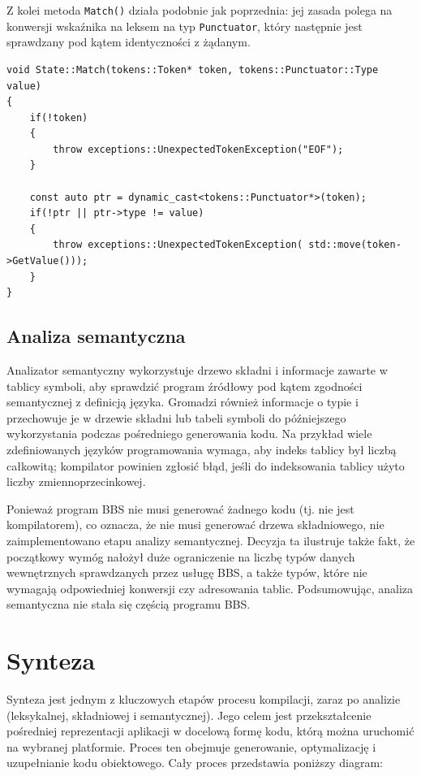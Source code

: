 Z kolei metoda \texttt{Match()} działa podobnie jak poprzednia: jej zasada polega na konwersji wskaźnika na leksem na typ \texttt{Punctuator}, który następnie jest sprawdzany pod kątem identyczności z żądanym.

\begin{lstlisting}[label=list:match,caption=Metoda State::Match(),basicstyle=\footnotesize\ttfamily]
void State::Match(tokens::Token* token, tokens::Punctuator::Type value)
{
    if(!token)
    {
        throw exceptions::UnexpectedTokenException("EOF");
    }
    
    const auto ptr = dynamic_cast<tokens::Punctuator*>(token);
    if(!ptr || ptr->type != value)
    {
        throw exceptions::UnexpectedTokenException( std::move(token->GetValue()));
    }
}
\end{lstlisting}

\subsection{Analiza semantyczna}

Analizator semantyczny wykorzystuje drzewo składni i informacje zawarte w tablicy symboli, aby sprawdzić program źródłowy pod kątem zgodności semantycznej z definicją języka. Gromadzi również informacje o typie i przechowuje je w drzewie składni lub tabeli symboli do późniejszego wykorzystania podczas pośredniego generowania kodu.
Na przykład wiele zdefiniowanych języków programowania wymaga, aby indeks tablicy był liczbą całkowitą; kompilator powinien zgłosić błąd, jeśli do indeksowania tablicy użyto liczby zmiennoprzecinkowej.

Ponieważ program BBS nie musi generować żadnego kodu (tj. nie jest kompilatorem), co oznacza, że nie musi generować drzewa składniowego, nie zaimplementowano etapu analizy semantycznej. Decyzja ta ilustruje także fakt, że początkowy wymóg nałożył duże ograniczenie na liczbę typów danych wewnętrznych sprawdzanych przez usługę BBS, a także typów, które nie wymagają odpowiedniej konwersji czy adresowania tablic. Podsumowując, analiza semantyczna nie stała się częścią programu BBS.

\section{Synteza}
Synteza jest jednym z kluczowych etapów procesu kompilacji, zaraz po analizie (leksykalnej, składniowej i semantycznej). Jego celem jest przekształcenie pośredniej reprezentacji aplikacji w docelową formę kodu, którą można uruchomić na wybranej platformie. Proces ten obejmuje generowanie, optymalizację i uzupełnianie kodu obiektowego. Cały proces przedstawia poniższy diagram:

